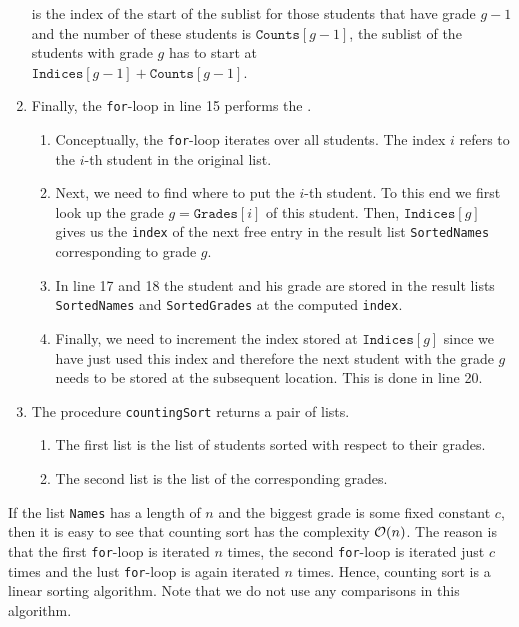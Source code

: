 \begin{enumerate}
      is the index of the start of the sublist for those students that have grade $g-1$ and the number of these
      students is $\texttt{Counts}[g-1]$, the sublist of the students with grade $g$ has to start at 
      \\[0.2cm]
      \hspace*{1.3cm}
      $\texttt{Indices}[g-1] + \texttt{Counts}[g-1]$.
\item Finally, the \texttt{for}-loop in line 15 performs the .
      \begin{enumerate}
      \item Conceptually, the \texttt{for}-loop iterates over all students. The index $i$ refers to the $i$-th
            student in the original list.
      \item Next, we need to find where to put the $i$-th student.  To this end we first look up the
            grade $g = \texttt{Grades}[i]$ of this student.  Then, $\texttt{Indices}[g]$ gives us
            the \texttt{index} of the next free entry in the result list \texttt{SortedNames} corresponding to grade $g$.
      \item In line 17 and 18 the student and his grade are stored in the result lists \texttt{SortedNames}
            and \texttt{SortedGrades} at the computed \texttt{index}.
      \item Finally, we need to increment the index stored at $\texttt{Indices}[g]$ since we have just used
            this index and therefore the next student with the grade $g$ needs to be stored at the subsequent location.
            This is done in line 20.
      \end{enumerate}
\item The procedure \texttt{countingSort} returns a pair of lists.
      \begin{enumerate}
      \item The first list is the list of students sorted with respect to their grades.
      \item The second list is the list of the corresponding grades.
      \end{enumerate}
\end{enumerate}
If the list \texttt{Names} has a length of $n$ and the biggest grade is some fixed constant $c$, then it is easy to
see that counting sort has the complexity $\mathcal{O}(n)$.  The reason is that the first \texttt{for}-loop is iterated
$n$ times, the second \texttt{for}-loop is iterated just $c$ times and the lust \texttt{for}-loop is again
iterated $n$ times.  Hence, counting sort is a linear sorting algorithm.  Note that we do not use any
comparisons in this algorithm.

